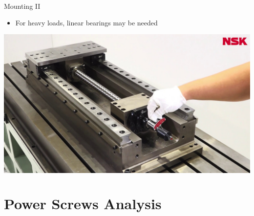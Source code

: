 \documentclass[10pt, svgnames]{beamer}
\begin{document}
\begin{frame}[label={sec:orgaad56d3}]{Mounting II}
\begin{itemize}
\item For heavy loads, linear bearings may be needed
\end{itemize}

\begin{center}
\includegraphics[width=.9\linewidth]{./pictures/screw-mounting.jpg}
\end{center}
\end{frame}

\section{Power Screws Analysis}
\label{sec:org4d2c496}
\end{document}
